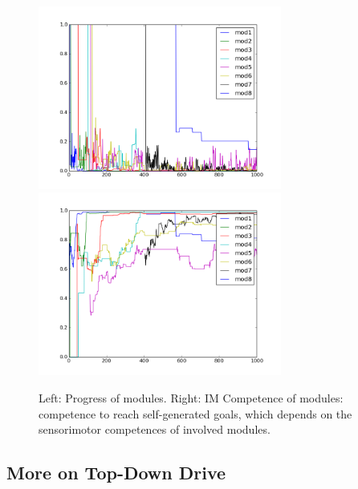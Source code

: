 \documentclass[12pt]{article}
\begin{document}
		\begin{figure}[H]
			\centering
			\includegraphics[width=8cm]{./include/autocreate_progresses.png}
			\includegraphics[width=8cm]{./include/autocreate_competences.png}
			\caption{Left: Progress of modules. Right: IM Competence of modules: competence to reach self-generated goals, which depends on the sensorimotor competences of involved modules.}
			\label{pc}
		\end{figure}
	
	
	
	
		
	\subsection{More on Top-Down Drive}
	\label{tddkdtree}
	
\end{document}
